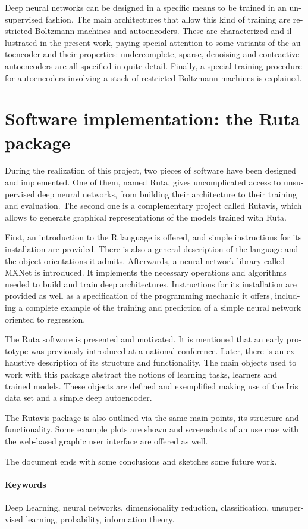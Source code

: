 \begin{otherlanguage}{american}
Deep neural networks can be designed in a specific means to be trained in an unsupervised fashion. The main architectures that allow this kind of training are restricted Boltzmann machines and autoencoders. These are characterized and illustrated in the present work, paying special attention to some variants of the autoencoder and their properties: undercomplete, sparse, denoising and contractive autoencoders are all specified in quite detail. Finally, a special training procedure for autoencoders involving a stack of restricted Boltzmann machines is explained.

\section*{Software implementation: the Ruta package}

During the realization of this project, two pieces of software have been designed and implemented. One of them, named Ruta, gives uncomplicated access to unsupervised deep neural networks, from building their architecture to their training and evaluation. The second one is a complementary project called Rutavis, which allows to generate graphical representations of the models trained with Ruta.

First, an introduction to the R language is offered, and simple instructions for its installation are provided. There is also a general description of the language and the object orientations it admits. Afterwards, a neural network library called MXNet is introduced. It implements the necessary operations and algorithms needed to build and train deep architectures. Instructions for its installation are provided as well as a specification of the programming mechanic it offers, including a complete example of the training and prediction of a simple neural network oriented to regression.

The Ruta software is presented and motivated. It is mentioned that an early prototype was previously introduced at a national conference. Later, there is an exhaustive description of its structure and functionality. The main objects used to work with this package abstract the notions of learning tasks, learners and trained models. These objects are defined and exemplified making use of the Iris data set and a simple deep autoencoder.

The Rutavis package is also outlined via the same main points, its structure and functionality. Some example plots are shown and screenshots of an use case with the web-based graphic user interface are offered as well.

The document ends with some conclusions and sketches some future work.

\paragraph{Keywords} Deep Learning, neural networks, dimensionality reduction, classification, unsupervised learning, probability, information theory.

\end{otherlanguage}
